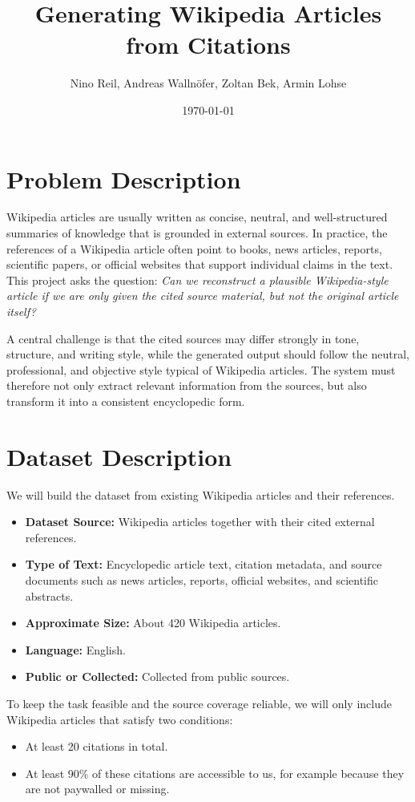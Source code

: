 \documentclass[10pt,a4paper]{article}
\title{\textbf{Generating Wikipedia Articles from Citations}}
\author{Nino Reil, Andreas Wallnöfer, Zoltan Bek, Armin Lohse}
\date{\today}
\begin{document}
\maketitle

\section{Problem Description}

Wikipedia articles are usually written as concise, neutral, and well-structured summaries of knowledge that is grounded in external sources. In practice, the references of a Wikipedia article often point to books, news articles, reports, scientific papers, or official websites that support individual claims in the text. This project asks the question: \emph{Can we reconstruct a plausible Wikipedia-style article if we are only given the cited source material, but not the original article itself?}

A central challenge is that the cited sources may differ strongly in tone, structure, and writing style, while the generated output should follow the neutral, professional, and objective style typical of Wikipedia articles. The system must therefore not only extract relevant information from the sources, but also transform it into a consistent encyclopedic form.

\section{Dataset Description}

We will build the dataset from existing Wikipedia articles and their references.

\begin{itemize}
    \item \textbf{Dataset Source:} Wikipedia articles together with their cited external references.
    \item \textbf{Type of Text:} Encyclopedic article text, citation metadata, and source documents such as news articles, reports, official websites, and scientific abstracts.
    \item \textbf{Approximate Size:} About 420 Wikipedia articles.
    \item \textbf{Language:} English.
    \item \textbf{Public or Collected:} Collected from public sources.
\end{itemize}

To keep the task feasible and the source coverage reliable, we will only include Wikipedia articles that satisfy two conditions:
\begin{itemize}
    \item At least 20 citations in total.
    \item At least 90\% of these citations are accessible to us, for example because they are not paywalled or missing.
\end{itemize}
\end{document}
